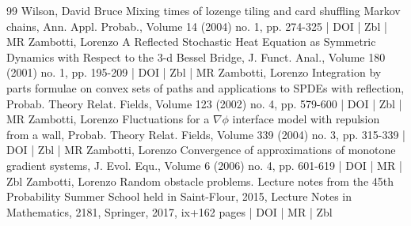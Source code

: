 \begin{thebibliography}{99}
 Wilson, David Bruce Mixing times of lozenge tiling and card shuffling Markov chains, Ann. Appl. Probab., Volume 14 (2004) no. 1, pp. 274-325 | DOI | Zbl | MR
 Zambotti, Lorenzo A Reflected Stochastic Heat Equation as Symmetric Dynamics with Respect to the 3-d Bessel Bridge, J. Funct. Anal., Volume 180 (2001) no. 1, pp. 195-209 | DOI | Zbl | MR
 Zambotti, Lorenzo Integration by parts formulae on convex sets of paths and applications to SPDEs with reflection, Probab. Theory Relat. Fields, Volume 123 (2002) no. 4, pp. 579-600 | DOI | Zbl | MR
 Zambotti, Lorenzo Fluctuations for a $\nabla \phi $ interface model with repulsion from a wall, Probab. Theory Relat. Fields, Volume 339 (2004) no. 3, pp. 315-339 | DOI | Zbl | MR
 Zambotti, Lorenzo Convergence of approximations of monotone gradient systems, J. Evol. Equ., Volume 6 (2006) no. 4, pp. 601-619 | DOI | MR | Zbl
 Zambotti, Lorenzo Random obstacle problems. Lecture notes from the 45th Probability Summer School held in Saint-Flour, 2015, Lecture Notes in Mathematics, 2181, Springer, 2017, ix+162 pages | DOI | MR | Zbl
\end{thebibliography}

